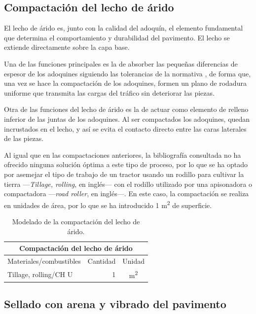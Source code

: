 \subsection{Compactación del lecho de árido}

El lecho de árido es, junto con la calidad del adoquín, el elemento fundamental que determina el comportamiento y durabilidad del pavimento. El lecho se extiende directamente sobre la capa base.

Una de las funciones principales es la de absorber las pequeñas diferencias de espesor de los adoquines siguiendo las tolerancias de la normativa \cite{une1338}, de forma que, una vez se hace la compactación de los adoquines, formen un plano de rodadura uniforme que transmita las cargas del tráfico sin deteriorar las piezas.

Otra de las funciones del lecho de árido es la de actuar como elemento de relleno inferior de las juntas de los adoquines. Al ser compactados los adoquines, quedan incrustados en el lecho, y así se evita el contacto directo entre las caras laterales de las piezas.


Al igual que en las compactaciones anteriores, la bibliografía consultada no ha ofrecido ninguna solución óptima a este tipo de proceso, por lo que se ha optado por asemejar el tipo de trabajo de un tractor usando un rodillo para cultivar la tierra —\textit{Tillage, rolling}, en inglés— con el rodillo utilizado por una apisonadora o compactadora —\textit{road roller}, en inglés—. En este caso, la compactación se realiza en unidades de área, por lo que se ha introducido 1 \si{m^2} de superficie.

\begin{table}[!htb]
\centering
\begin{tabular}{p{8cm}rc}
\toprule
\multicolumn{3}{c}{Compactación del lecho de árido}\\
\midrule
Materiales/combustibles & Cantidad & Unidad\\
\midrule
Tillage, rolling/CH U & 1 & \si{m^2}\\
\bottomrule
\end{tabular}
\caption{Modelado de la compactación del lecho de árido.}
\label{modeladolecho}
\end{table}

\subsection{Sellado con arena y vibrado del pavimento}\label{sec:selladoinstalacion}

